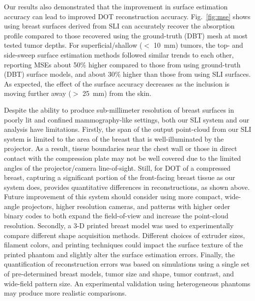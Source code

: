Our results also demonstrated that the improvement in surface estimation accuracy can lead to improved \ac{DOT} reconstruction accuracy. Fig.~\ref{fig:mse} shows using breast surfaces derived from \ac{SLI} can accurately recover the absorption profile compared to those recovered using the ground-truth (\ac{DBT}) mesh at most tested tumor depths. For superficial/shallow ($<$ 10~mm) tumors, the top- and side-sweep surface estimation methods followed similar trends to each other, reporting \ac{MSE}s about 50\% higher compared to those from using ground-truth (\ac{DBT}) surface models, and about 30\% higher than those from using \ac{SLI} surfaces. As expected, the effect of the surface accuracy decreases as the inclusion is moving further away ($>$ 25~mm) from the skin.


Despite the ability to produce sub-millimeter resolution of breast surfaces in poorly lit and confined mammography-like settings, both our \ac{SLI} system and our analysis have limitations. Firstly, the span of the output point-cloud from our \ac{SLI} system is limited to the area of the breast that is well-illuminated by the projector. As a result, tissue boundaries near the chest wall or those in direct contact with the compression plate may not be well covered due to the limited angles of the projector/camera line-of-sight. Still, for \ac{DOT} of a compressed breast, capturing a significant portion of the front-facing breast tissue as our system does, provides quantitative differences in reconstructions, as shown above. Future improvement of this system should consider using more compact, wide-angle projectors, higher resolution cameras, and patterns with higher order binary codes to both expand the field-of-view and increase the point-cloud resolution. Secondly, a 3-D printed breast model was used to experimentally compare different shape acquisition methods. Different choices of extruder sizes, filament colors, and printing techniques could impact the surface texture of the printed phantom and slightly alter the surface estimation errors. Finally, the quantification of reconstruction errors was based on simulations using a single set of pre-determined breast models, tumor size and shape, tumor contrast, and wide-field pattern size. An experimental validation using heterogeneous phantoms may produce more realistic comparisons.


